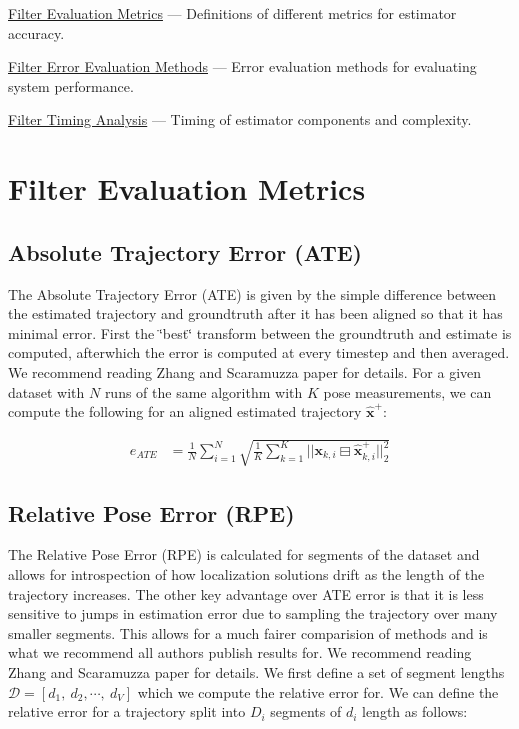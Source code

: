 \begin{DoxyItemize}
\item \hyperlink{eval-metrics}{Filter Evaluation Metrics} --- Definitions of different metrics for estimator accuracy.
\item \hyperlink{eval-error}{Filter Error Evaluation Methods} --- Error evaluation methods for evaluating system performance.
\item \hyperlink{eval-timing}{Filter Timing Analysis} --- Timing of estimator components and complexity. 
\end{DoxyItemize}\hypertarget{eval-metrics}{}\section{Filter Evaluation Metrics}\label{eval-metrics}
\hypertarget{eval-metrics_eval-ate}{}\subsection{Absolute Trajectory Error (\+A\+T\+E)}\label{eval-metrics_eval-ate}
The Absolute Trajectory Error (A\+TE) is given by the simple difference between the estimated trajectory and groundtruth after it has been aligned so that it has minimal error. First the \char`\"{}best\char`\"{} transform between the groundtruth and estimate is computed, afterwhich the error is computed at every timestep and then averaged. We recommend reading Zhang and Scaramuzza \cite{Zhang2018IROS} paper for details. For a given dataset with $N$ runs of the same algorithm with $K$ pose measurements, we can compute the following for an aligned estimated trajectory $\hat{\mathbf{x}}^+$\+:

\begin{align*} e_{ATE} &= \frac{1}{N} \sum_{i=1}^{N} \sqrt{ \frac{1}{K} \sum_{k=1}^{K} ||\mathbf{x}_{k,i} \boxminus \hat{\mathbf{x}}^+_{k,i}||^2_{2} } \end{align*}\hypertarget{eval-metrics_eval-rpe}{}\subsection{Relative Pose Error (\+R\+P\+E)}\label{eval-metrics_eval-rpe}
The Relative Pose Error (R\+PE) is calculated for segments of the dataset and allows for introspection of how localization solutions drift as the length of the trajectory increases. The other key advantage over A\+TE error is that it is less sensitive to jumps in estimation error due to sampling the trajectory over many smaller segments. This allows for a much fairer comparision of methods and is what we recommend all authors publish results for. We recommend reading Zhang and Scaramuzza \cite{Zhang2018IROS} paper for details. We first define a set of segment lengths $\mathcal{D} = [d_1,~d_2,\cdots,~d_V]$ which we compute the relative error for. We can define the relative error for a trajectory split into $D_i$ segments of $d_i$ length as follows\+:

